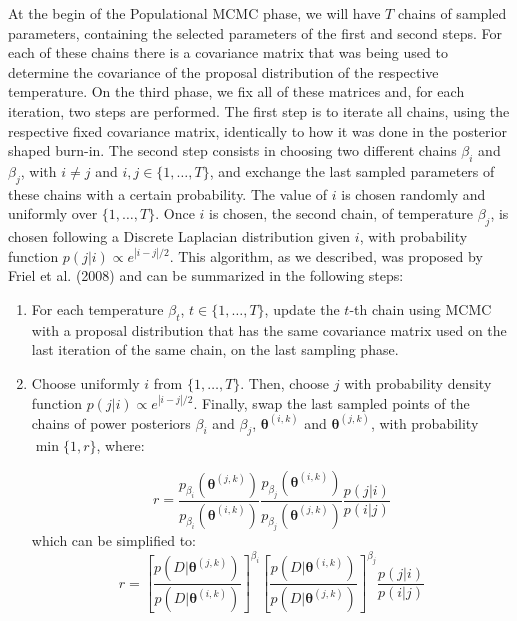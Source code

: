 At the begin of the Populational MCMC phase, we will have $T$ chains of 
sampled parameters, containing the selected parameters of the first and 
second steps. For each of these chains there is a covariance matrix that 
was being used to determine the covariance of the proposal distribution 
of the respective temperature. On the third phase, we fix all of these
matrices and, for each iteration, two steps are performed. The first
step is to iterate all chains, using the respective fixed covariance 
matrix, identically to how it was done in the posterior shaped burn-in.
The second step consists in choosing two different chains $\beta_i$ and
$\beta_j$, with $i \neq j$ and $i, j \in \{1, \ldots, T\}$, and exchange
the last sampled parameters of these chains with a certain probability.
The value of $i$ is chosen randomly and uniformly over $\{1, \ldots,
T\}$. Once $i$ is chosen, the second chain, of temperature $\beta_j$, is
chosen following a Discrete Laplacian distribution given $i$, with 
probability function $p (j | i) \propto e^{|i - j| / 2}$. This
algorithm, as we described, was proposed by Friel et al. (2008) and can 
be summarized in the following steps:
\begin{enumerate}
    \item{For each temperature $\beta_t$, $t \in \{1, \ldots, T\}$, 
        update the $t$-th chain using MCMC with a proposal distribution
        that has the same covariance matrix used on the last iteration
        of the same chain, on the last sampling phase.}
    \item{Choose uniformly $i$ from $\{1, \ldots, T\}$. Then, choose
        $j$ with probability density function $p (j | i) \propto 
        e^{|i - j| / 2}$. Finally, swap the last sampled points of 
        the chains of power posteriors $\beta_i$ and $\beta_j$, 
        ${\bm \theta}^{(i, k)}$ and ${\bm \theta}^{(j, k)}$, with 
        probability $\min\{1, r\}$, where: }

    \begin{equation*}
        r = \frac{p_{\beta_i}\left({\bm \theta}^{(j, k)}\right)}
             {p_{\beta_i}\left({\bm \theta}^{(i, k)}\right)}
        \frac{p_{\beta_j}\left({\bm \theta}^{(i, k)}\right)}
             {p_{\beta_j}\left({\bm \theta}^{(j, k)}\right)}
        \frac{p (j | i)}
             {p (i | j)}
    \end{equation*}
    which can be simplified to:
    \begin{equation*}
        r = \left[\frac{p \left(D | {\bm \theta}^{(j, k)}\right)}
                {p \left(D | {\bm \theta}^{(i,
                k)}\right)}\right]^{\beta_i}
            \left[\frac{p \left(D | {\bm \theta}^{(i, k)}\right)}
                {p \left(D | {\bm \theta}^{(j,
                k)}\right)}\right]^{\beta_j}
            \frac{p (j | i)}
                 {p (i | j)}
    \end{equation*}
\end{enumerate}

